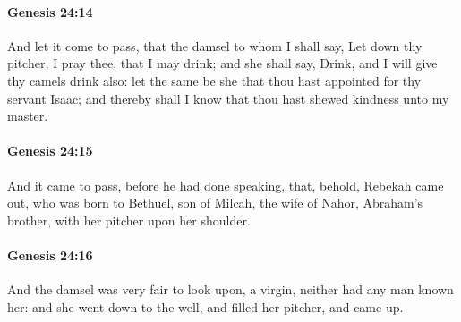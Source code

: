 		\paragraph{Genesis 24:14} %
			\label{GENESIS-24-14}

			And let it come to pass, that the damsel to whom I shall say, Let down thy pitcher, I pray thee, that I may drink; and she shall say, Drink, and I will give thy camels drink also: let the same be she that thou hast appointed for thy servant Isaac; and thereby shall I know that thou hast shewed kindness unto my master.


		\paragraph{Genesis 24:15} %
			\label{GENESIS-24-15}

			And it came to pass, before he had done speaking, that, behold, Rebekah came out, who was born to Bethuel, son of Milcah, the wife of Nahor, Abraham's brother, with her pitcher upon her shoulder.


		\paragraph{Genesis 24:16} %
			\label{GENESIS-24-16}

			And the damsel was very fair to look upon, a virgin, neither had any man known her: and she went down to the well, and filled her pitcher, and came up.


